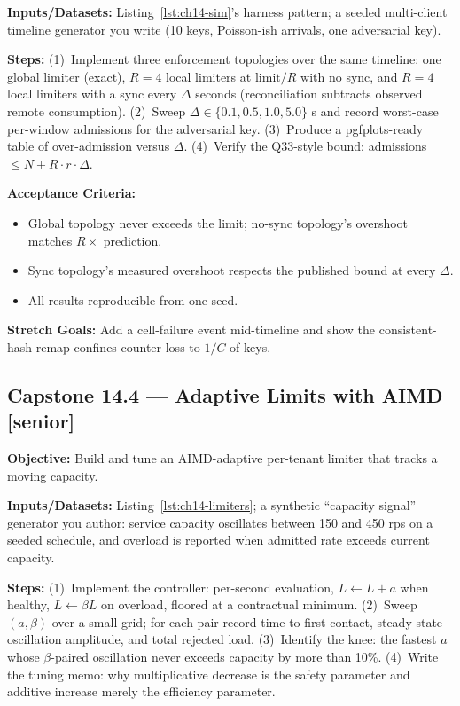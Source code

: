 \textbf{Inputs/Datasets:} Listing~\ref{lst:ch14-sim}'s harness pattern; a
seeded multi-client timeline generator you write (10 keys, Poisson-ish
arrivals, one adversarial key).

\textbf{Steps:} (1)~Implement three enforcement topologies over the same
timeline: one global limiter (exact), $R=4$ local limiters at
$\mathrm{limit}/R$ with no sync, and $R=4$ local limiters with a sync every
$\Delta$ seconds (reconciliation subtracts observed remote consumption).
(2)~Sweep $\Delta \in \{0.1, 0.5, 1.0, 5.0\}$ s and record worst-case
per-window admissions for the adversarial key. (3)~Produce a pgfplots-ready
table of over-admission versus $\Delta$. (4)~Verify the
Q33-style bound: admissions $\le N + R \cdot r \cdot \Delta$.

\textbf{Acceptance Criteria:}
\begin{itemize}
  \item[$\square$] Global topology never exceeds the limit; no-sync
        topology's overshoot matches $R \times$ prediction.
  \item[$\square$] Sync topology's measured overshoot respects the
        published bound at every $\Delta$.
  \item[$\square$] All results reproducible from one seed.
\end{itemize}

\textbf{Stretch Goals:} Add a cell-failure event mid-timeline and show the
consistent-hash remap confines counter loss to $1/C$ of keys.

\subsection*{Capstone 14.4 --- Adaptive Limits with AIMD \hfill [senior]}
\textbf{Objective:} Build and tune an AIMD-adaptive per-tenant limiter that
tracks a moving capacity.

\textbf{Inputs/Datasets:} Listing~\ref{lst:ch14-limiters}; a synthetic
``capacity signal'' generator you author: service capacity oscillates
between 150 and 450 rps on a seeded schedule, and overload is reported when
admitted rate exceeds current capacity.

\textbf{Steps:} (1)~Implement the controller: per-second evaluation,
$L \leftarrow L + a$ when healthy, $L \leftarrow \beta L$ on overload,
floored at a contractual minimum. (2)~Sweep $(a, \beta)$ over a small grid;
for each pair record time-to-first-contact, steady-state oscillation
amplitude, and total rejected load. (3)~Identify the knee: the fastest
$a$ whose $\beta$-paired oscillation never exceeds capacity by more than
10\%. (4)~Write the tuning memo: why multiplicative decrease is the safety
parameter and additive increase merely the efficiency parameter.

